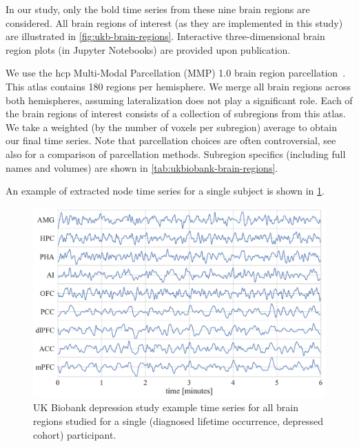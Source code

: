 In our study, only the \gls{bold} time series from these nine brain regions are considered.
All brain regions of interest (as they are implemented in this study) are illustrated in \cref{fig:ukb-brain-regions}.
Interactive three-dimensional brain region plots (in Jupyter Notebooks) are provided upon publication.

We use the \gls{hcp} Multi-Modal Parcellation (MMP) 1.0 brain region parcellation~\parencite{Glasser2016}.
This atlas contains 180 regions per hemisphere.
We merge all brain regions across both hemispheres, assuming lateralization does not play a significant role.
Each of the brain regions of interest consists of a collection of subregions from this atlas.
We take a weighted (by the number of voxels per subregion) average to obtain our final time series.
Note that parcellation choices are often controversial, see also \textcite{Arslan2018, Bryce2021} for a comparison of parcellation methods.
Subregion specifics (including full names and volumes) are shown in \cref{tab:ukbiobank-brain-regions}.



An example of extracted node time series for a single subject is shown in \cref{fig:ukb-example-time-series}.


\begin{figure}[t]
  \centering
  \includegraphics[width=\textwidth]{fig/ukbiobank/node_timeseries/diagnosed_lifetime_occurrence/depressed/time_series_regions_of_interest}
  \caption{
    UK Biobank depression study example time series for all brain regions studied for a single (diagnosed lifetime occurrence, depressed cohort) participant.
  }\label{fig:ukb-example-time-series}
\end{figure}


